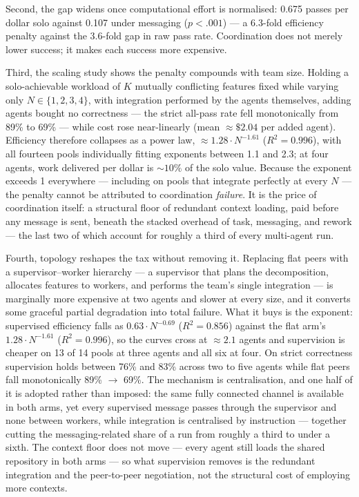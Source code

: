 \documentclass[11pt,a4paper]{article}
\begin{document}
Second, the gap widens once computational effort is normalised: 0.675 passes per dollar solo against 0.107 under messaging ($p < .001$) --- a 6.3-fold efficiency penalty against the 3.6-fold gap in raw pass rate. Coordination does not merely lower success; it makes each success more expensive.

Third, the scaling study shows the penalty compounds with team size. Holding a solo-achievable workload of $K$ mutually conflicting features fixed while varying only $N \in \{1, 2, 3, 4\}$, with integration performed by the agents themselves, adding agents bought no correctness --- the strict all-pass rate fell monotonically from 89\% to 69\% --- while cost rose near-linearly (mean $\approx \$2.04$ per added agent). Efficiency therefore collapses as a power law, $\approx 1.28 \cdot N^{-1.61}$ ($R^2 = 0.996$), with all fourteen pools individually fitting exponents between 1.1 and 2.3; at four agents, work delivered per dollar is ${\sim}10\%$ of the solo value. Because the exponent exceeds 1 everywhere --- including on pools that integrate perfectly at every $N$ --- the penalty cannot be attributed to coordination \emph{failure}. It is the price of coordination itself: a structural floor of redundant context loading, paid before any message is sent, beneath the stacked overhead of task, messaging, and rework --- the last two of which account for roughly a third of every multi-agent run.

Fourth, topology reshapes the tax without removing it. Replacing flat peers with a supervisor--worker hierarchy --- a supervisor that plans the decomposition, allocates features to workers, and performs the team's single integration --- is marginally more expensive at two agents and slower at every size, and it converts some graceful partial degradation into total failure. What it buys is the exponent: supervised efficiency falls as $0.63 \cdot N^{-0.69}$ ($R^2 = 0.856$) against the flat arm's $1.28 \cdot N^{-1.61}$ ($R^2 = 0.996$), so the curves cross at ${\approx}2.1$ agents and supervision is cheaper on 13 of 14 pools at three agents and all six at four. On strict correctness supervision holds between 76\% and 83\% across two to five agents while flat peers fall monotonically 89\% $\rightarrow$ 69\%. The mechanism is centralisation, and one half of it is adopted rather than imposed: the same fully connected channel is available in both arms, yet every supervised message passes through the supervisor and none between workers, while integration is centralised by instruction --- together cutting the messaging-related share of a run from roughly a third to under a sixth. The context floor does not move --- every agent still loads the shared repository in both arms --- so what supervision removes is the redundant integration and the peer-to-peer negotiation, not the structural cost of employing more contexts.
\end{document}
